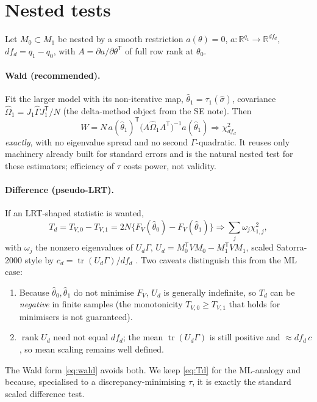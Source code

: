 \documentclass[11pt]{article}
\newcommand{\tr}{\operatorname{tr}}
\newcommand{\rank}{\operatorname{rank}}
\newcommand{\T}{^{\mathsf T}}
\newcommand{\Ninv}{^{-1}}
\theoremstyle{plain}
\theoremstyle{definition}
\theoremstyle{remark}
\begin{document}
\section{Nested tests}\label{sec:nested}

Let $M_0\subset M_1$ be nested by a smooth restriction $a(\theta)=0$,
$a:\mathbb R^{q_1}\to\mathbb R^{df_d}$, $df_d=q_1-q_0$, with
$A=\partial a/\partial\theta\T$ of full row rank at $\theta_0$.

\paragraph{Wald (recommended).} Fit the larger model with its non-iterative map,
$\hat\theta_1=\tau_1(\hat\sigma)$, covariance
$\widehat\Omega_1=J_1\widehat\Gamma J_1\T/N$ (the delta-method object from the SE
note). Then
\begin{equation}\label{eq:wald}
  W=N\,a(\hat\theta_1)\T\big(A\widehat\Omega_1 A\T\big)\Ninv a(\hat\theta_1)
  \Rightarrow\chi^2_{df_d}
\end{equation}
\emph{exactly}, with no eigenvalue spread and no second $\Gamma$-quadratic. It
reuses only machinery already built for standard errors and is the natural
nested test for these estimators; efficiency of $\tau$ costs power, not
validity.

\paragraph{Difference (pseudo-LRT).} If an LRT-shaped statistic is wanted,
\begin{equation}\label{eq:Td}
  T_d=T_{V,0}-T_{V,1}
    =2N\{F_V(\hat\theta_0)-F_V(\hat\theta_1)\}
  \Rightarrow\sum_j\omega_j\chi^2_{1,j},
\end{equation}
with $\omega_j$ the nonzero eigenvalues of $U_d\Gamma$,
$U_d=M_0\T V M_0-M_1\T V M_1$, scaled Satorra-2000 style by
$c_d=\tr(U_d\Gamma)/df_d$ \cite{satorra2000,satorrabentler2001}. Two caveats
distinguish this from the ML case:
\begin{enumerate}
\item Because $\hat\theta_0,\hat\theta_1$ do not minimise $F_V$, $U_d$ is
  generally indefinite, so $T_d$ can be \emph{negative} in finite samples (the
  monotonicity $T_{V,0}\ge T_{V,1}$ that holds for minimisers is not guaranteed).
\item $\rank U_d$ need not equal $df_d$; the mean $\tr(U_d\Gamma)$ is still
  positive and $\approx df_d\,c$, so mean scaling remains well defined.
\end{enumerate}
The Wald form \eqref{eq:wald} avoids both. We keep \eqref{eq:Td} for the
ML-analogy and because, specialised to a discrepancy-minimising $\tau$, it is
exactly the standard scaled difference test.
\end{document}

